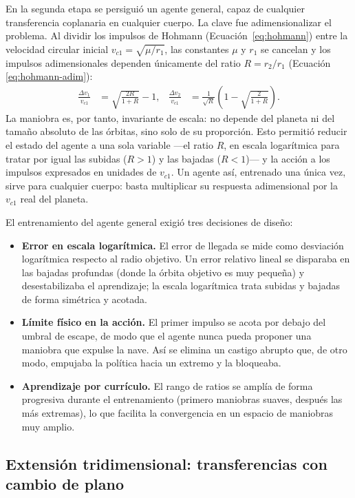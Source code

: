 En la segunda etapa se persiguió un agente general, capaz de cualquier transferencia coplanaria en cualquier cuerpo. La clave fue adimensionalizar el problema. Al dividir los impulsos de Hohmann (Ecuación~\eqref{eq:hohmann}) entre la velocidad circular inicial $v_{c1}=\sqrt{\mu/r_1}$, las constantes $\mu$ y $r_1$ se cancelan y los
impulsos adimensionales dependen únicamente del ratio $R=r_2/r_1$ (Ecuación \ref{eq:hohmann-adim}):
\begin{align}
  \frac{\Delta v_1}{v_{c1}} &= \sqrt{\frac{2R}{1+R}} - 1, &
  \frac{\Delta v_2}{v_{c1}} &= \frac{1}{\sqrt{R}}\left(1 - \sqrt{\frac{2}{1+R}}\right).
  \label{eq:hohmann-adim}
\end{align}
La maniobra es, por tanto, invariante de escala: no depende del planeta ni del tamaño absoluto de las órbitas, sino solo de su proporción. Esto permitió reducir el estado del agente a una sola variable ---el ratio $R$, en escala logarítmica para tratar por igual las subidas ($R>1$) y las bajadas ($R<1$)--- y la acción a los impulsos expresados en unidades de $v_{c1}$. Un agente así, entrenado una única vez, sirve para cualquier cuerpo: basta multiplicar su respuesta adimensional por la $v_{c1}$ real del planeta.

El entrenamiento del agente general exigió tres decisiones de diseño:
\begin{itemize}
  \item \textbf{Error en escala logarítmica.} El error de llegada se mide como desviación logarítmica respecto al radio objetivo. Un error relativo lineal se disparaba en las bajadas profundas (donde la órbita objetivo es muy pequeña) y desestabilizaba el aprendizaje; la escala logarítmica trata subidas y bajadas de forma simétrica y acotada.
  \item \textbf{Límite físico en la acción.} El primer impulso se acota por debajo del umbral de escape, de modo que el agente nunca pueda proponer una maniobra que expulse la nave. Así se elimina un castigo abrupto que, de otro modo, empujaba la política hacia un extremo y la bloqueaba.
  \item \textbf{Aprendizaje por currículo.} El rango de ratios se amplía de forma progresiva durante el entrenamiento (primero maniobras suaves, después las más extremas), lo que facilita la convergencia en un espacio de maniobras muy amplio.
\end{itemize}

\subsection{Extensión tridimensional: transferencias con cambio de plano}
\label{sec:ia-transfer3d}

